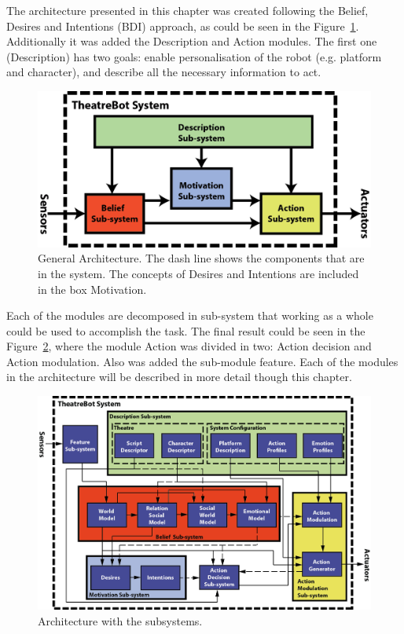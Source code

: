 The architecture presented in this chapter was created following the Belief, Desires and Intentions (BDI) approach, as could be seen in the Figure~\ref{fig:GeneralArchitecture}. Additionally it was added the Description and Action modules. The first one (Description) has two goals: enable personalisation of the robot (e.g. platform and character), and describe all the necessary information to act.
\begin{figure}
	\centering
	\includegraphics[width=1.0\textwidth]{./Images/Architecture/GeneralArchitecture.png} 
	\caption{General Architecture. The dash line shows the components that are in the system. The concepts of Desires and Intentions are included in the box Motivation.}
	\label{fig:GeneralArchitecture}
\end{figure}
Each of the modules are decomposed in sub-system that working as a whole could be used to accomplish the task. The final result could be seen in the Figure~\ref{fig:ArchitectureWithSubSystems}, where the module Action was divided in two: Action decision and Action modulation. Also was added the sub-module feature. Each of the modules in the architecture will be described in more detail though this chapter. 
\begin{figure}
	\centering
	\includegraphics[width=1.0\textwidth]{./Images/Architecture/ArchitectureNew.png} 
	\caption{Architecture with the subsystems.}
	\label{fig:ArchitectureWithSubSystems}
\end{figure}



